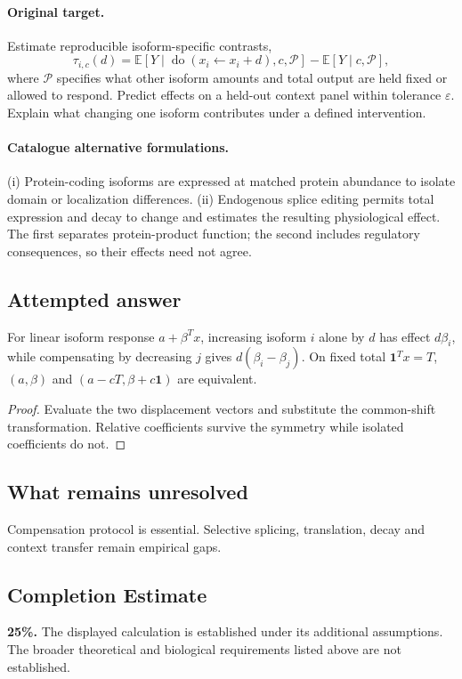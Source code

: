 \documentclass[11pt]{article}
\begin{document}
\paragraph{Original target.}
Estimate reproducible isoform-specific contrasts,
\[
\tau_{i,c}(d)=\mathbb{E}[Y\mid\operatorname{do}(x_i\leftarrow x_i+d),c,\mathcal P]
-\mathbb{E}[Y\mid c,\mathcal P],
\]
where $\mathcal P$ specifies what other isoform amounts and total output are held fixed or allowed to respond. Predict effects on a held-out context panel within tolerance $\varepsilon$. Explain what changing one isoform contributes under a defined intervention.
\paragraph{Catalogue alternative formulations.}
(i) Protein-coding isoforms are expressed at matched protein abundance to isolate domain or localization differences. (ii) Endogenous splice editing permits total expression and decay to change and estimates the resulting physiological effect. The first separates protein-product function; the second includes regulatory consequences, so their effects need not agree.
\subsection{Attempted answer}
\begin{proposition}
For linear isoform response $a+\beta^Tx$, increasing isoform $i$ alone by $d$ has effect $d\beta_i$, while compensating by decreasing $j$ gives $d(\beta_i-\beta_j)$. On fixed total $\mathbf1^Tx=T$, $(a,\beta)$ and $(a-cT,\beta+c\mathbf1)$ are equivalent.
\end{proposition}
\begin{proof}
Evaluate the two displacement vectors and substitute the common-shift transformation. Relative coefficients survive the symmetry while isolated coefficients do not.
\end{proof}
\subsection{What remains unresolved}
Compensation protocol is essential. Selective splicing, translation, decay and context transfer remain empirical gaps.
\subsection{Completion Estimate}
\textbf{25\%.} The displayed calculation is established under its additional assumptions. The broader theoretical and biological requirements listed above are not established.
\end{document}
